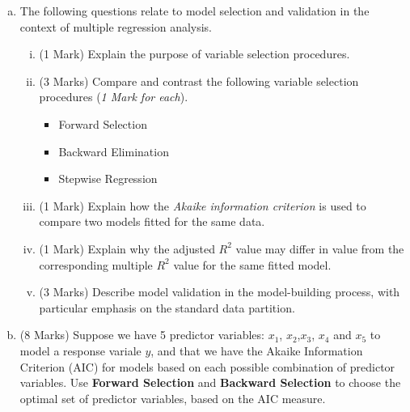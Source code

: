 \documentclass[a4paper,12pt]{article}
\begin{document}
\begin{enumerate}
\begin{enumerate}[(a)]
\item The following questions relate to model selection and validation in the context of multiple
regression analysis.
\begin{enumerate}[(i)]
\item (1 Mark) Explain the purpose of variable selection procedures.
\item (3 Marks) Compare and contrast the following variable selection procedures (\textit{1 Mark for each}).
\begin{itemize}

		\item Forward Selection
		\item Backward Elimination
		\item Stepwise Regression
\end{itemize}
\item (1 Mark)  Explain how the \emph{Akaike information criterion} is used to compare two models fitted for the same data.
\item (1 Mark) Explain why the adjusted $R^2$ value may differ in value from the corresponding multiple $R^2$ value for the same fitted model.
\item (3 Marks) Describe model validation in the model-building process, with particular emphasis on the standard data partition.
\end{enumerate}
\newpage
\item (8 Marks) Suppose we have 5 predictor variables: $x_1$, $x_2$,$x_3$, $x_4$ and $x_5$ to model a response variale $y$, and that we have the Akaike Information Criterion (AIC) for models based on each possible combination of predictor variables.
Use \textbf{Forward Selection} and \textbf{Backward Selection} to choose the optimal set of predictor variables, based on the AIC measure.


\end{enumerate}
\end{enumerate}
\end{document}
